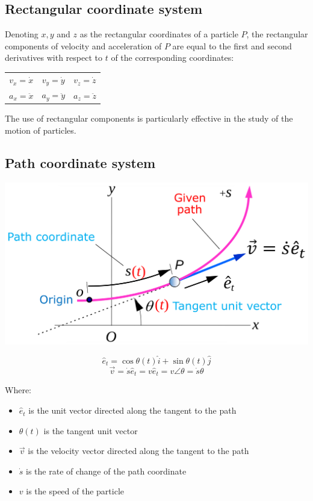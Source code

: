 \documentclass[11pt]{article}
\begin{document}
\subsection{Rectangular coordinate system}
\label{sec:org0bb07fc}
Denoting \(x, y\) and \(z\) as the rectangular coordinates of a particle \(P\), the rectangular components of velocity and acceleration of \(P\) are equal to the first and second derivatives with respect to \(t\) of the corresponding coordinates:
\begin{center}
\begin{tabular}{ c c c }
$v_x = \dot{x}$ & $v_y = \dot{y}$ & $v_z = \dot{z}$ \\
$a_x = \ddot{x}$ & $a_y = \ddot{y}$ & $a_z = \ddot{z}$
\end{tabular}
\end{center}

The use of rectangular components is particularly effective in the study of the motion of particles.

\subsection{Path coordinate system}
\label{sec:orgdfaf524}
\begin{center}
\includegraphics[width=.9\linewidth]{./images/path-coordinate-system.png}
\end{center}

\[\hat{e}_t = \cos \theta (t) \hat{i} + \sin \theta (t) \hat{j}\]
\[\vec{v} = \dot{s} \hat{e}_t = v \hat{e}_t = v \angle \theta = \dot{s} \theta\]

Where:
\begin{itemize}
\item \(\hat{e}_t\) is the unit vector directed along the tangent to the path
\item \(\theta (t)\) is the tangent unit vector
\item \(\vec{v}\) is the velocity vector directed along the tangent to the path
\item \(\dot{s}\) is the rate of change of the path coordinate
\item \(v\) is the speed of the particle
\end{itemize}
\end{document}
